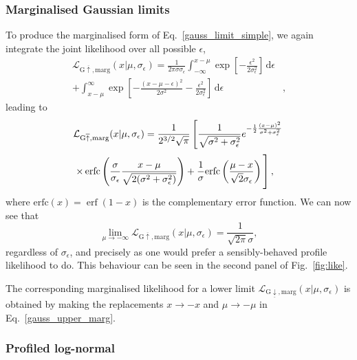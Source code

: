 \documentclass[pdftex,twocolumn,epjc3_preprint,runningheads]{svjour3}
\renewcommand{\_}{\discretionary{\underscore}{}{\underscore}}
\DeclareMathOperator\erf{erf}
\begin{document}
\subsubsection{Marginalised Gaussian limits}

To produce the marginalised form of Eq.\ \ref{gauss_limit_simple}, we again integrate the joint likelihood over all possible $\epsilon$,
\begin{align}
\mathcal{L}_{\mathrm{G}\overline{\uparrow},\mathrm{marg}}(x|\mu,\sigma_\epsilon) = \frac{1}{2\pi\sigma\sigma_\epsilon} \int_{-\infty}^{x-\mu} \exp\left[-\frac{\epsilon^2}{2\sigma_\epsilon^2}\right]\,\mathrm{d}\epsilon& \nonumber\\
 + \int_{x-\mu}^\infty \exp\left[-\frac{(x-\mu-\epsilon)^2}{2\sigma^2} - \frac{\epsilon^2}{2\sigma_\epsilon^2}\right]\,\mathrm{d}\epsilon&,
\end{align}
leading to
\begin{align}
\label{gauss_upper_marg}
&\mathcal{L}_{\mathrm{G}\overline{\uparrow},\mathrm{marg}}(x|\mu,\sigma_\epsilon) = \frac{1}{2^{3/2}\sqrt{\pi}}\left[\frac{1}{\sqrt{\sigma^2+\sigma_\epsilon^2}} e^{-\frac12\frac{(x-\mu)^2}{\sigma^2+\sigma_\epsilon^2}}\right.\nonumber\\
&\left.\times\,\mathrm{erfc}\left(\frac{\sigma}{\sigma_\epsilon}\frac{x-\mu}{\sqrt{2(\sigma^2+\sigma_\epsilon^2)}} \right) + \frac{1}{\sigma}\mathrm{erfc}\left(\frac{\mu-x}{\sqrt{2}\sigma_\epsilon}\right)\vphantom{\frac{e^{\frac12\frac{(x-\mu)^2}{\sigma^2+\sigma_\epsilon^2}}}{\sqrt{\sigma^2+\sigma_\epsilon^2}}}\right],
\end{align}
where $\mathrm{erfc}(x) = \erf(1-x)$ is the complementary error function. We can now see that
\begin{equation}
\lim_{\mu\to-\infty} \mathcal{L}_{\mathrm{G}\overline{\uparrow},\mathrm{marg}}(x|\mu,\sigma_\epsilon) = \frac{1}{\sqrt{2\pi}\sigma},
\end{equation}
regardless of $\sigma_\epsilon$, and precisely as one would prefer a sensibly-behaved profile likelihood to do.  This behaviour can be seen in the second panel of Fig.\ \ref{fig:like}.

The corresponding marginalised likelihood for a lower limit $\mathcal{L}_{\mathrm{G}\underline{\downarrow},\mathrm{marg}}(x|\mu,\sigma_\epsilon)$ is obtained by making the replacements $x\rightarrow-x$ and $\mu\rightarrow-\mu$ in Eq.\ \ref{gauss_upper_marg}.

\subsubsection{Profiled log-normal}
\end{document}
